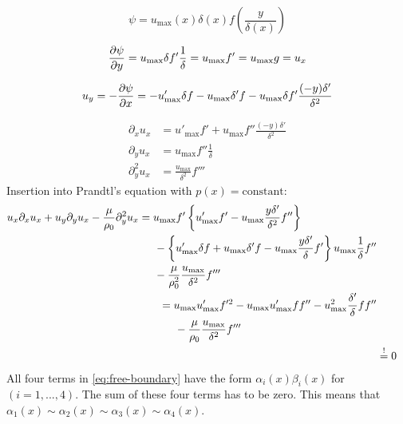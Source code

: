 \begin{equation}
\psi = u_\mathrm{max}(x)\delta(x)f\left(\frac{y}{\delta(x)}\right)
\end{equation}

\begin{equation}
\frac{\partial \psi}{\partial y}=u_\mathrm{max}\delta f'\frac{1}{\delta}=u_\mathrm{max}f'=u_\mathrm{max}g=u_x
\end{equation}

\begin{equation}
u_y=-\frac{\partial \psi}{\partial x}=-u'_\mathrm{max}\delta f-u_\mathrm{max}\delta'f-u_\mathrm{max}\delta f'\frac{(-y)\delta'}{\delta^2}
\end{equation}

\begin{align}
\partial_xu_x &= u'_\mathrm{max}f'+u_\mathrm{max}f''\frac{(-y)\delta'}{\delta^2} \\
\partial_yu_x &= u_\mathrm{max} f''\frac{1}{\delta}\\
\partial^2_yu_x &= \frac{u_\mathrm{max}}{\delta^2}f'''
\end{align}
Insertion into Prandtl's equation with $p(x)=\text{constant}$:
\begin{align}
\begin{split}
u_x\partial_x u_x+u_y\partial_yu_x-\frac{\mu}{\rho_0}\partial^2_yu_x &= u_\mathrm{max}f'\left\lbrace u'_\mathrm{max}f' - u_\mathrm{max}\frac{y\delta'}{\delta^2}f''\right\rbrace \\
&\hspace{5mm}-\left\lbrace u'_\mathrm{max}\delta f + u_\mathrm{max}\delta'f-u_\mathrm{max}\frac{y\delta'}{\delta}f'\right\rbrace u_\mathrm{max}\frac{1}{\delta}f'' \\
&\hspace{5mm}-\frac{\mu}{\rho_0^2} \frac{u_\mathrm{max}}{\delta^2}f'''
\end{split}\\
\begin{split}
&= u_\mathrm{max}u'_\mathrm{max}f'^2-u_\mathrm{max}u'_\mathrm{max}ff''-u_\mathrm{max}^2\frac{\delta'}{\delta}ff'' \\
&\hspace{5mm}-\frac{\mu}{\rho_0}\frac{u_\mathrm{max}}{\delta^2}f'''\label{eq:free-boundary}
\end{split} \\
&\overset{!}{=}0 \label{eq:prandtl}
\end{align}
All four terms in \eqref{eq:free-boundary} have the form $\alpha_i(x)\beta_i(x)$ for $(i=1,...,4)$. The sum of these four terms has to be zero. This means that $\alpha_1(x)\sim\alpha_2(x)\sim\alpha_3(x)\sim\alpha_4(x)$.


